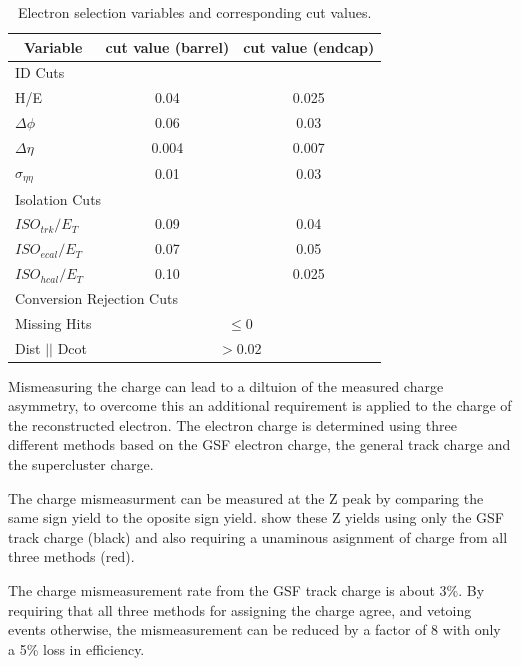 \begin{table}[htbp]
  \begin{center}
    \leavevmode
    \begin{tabular}{lcc} 
      \multicolumn{1}{c}{Variable} & \multicolumn{1}{c}{cut value (barrel)}& \multicolumn{1}{c}{cut value (endcap)}\\
      \hline
      \multicolumn{3}{l}{ID Cuts}\\ 
        H/E & 0.04 & 0.025 \\
        $\Delta\phi$ & 0.06 & 0.03 \\
        $\Delta\eta$ & 0.004 & 0.007  \\
        $\sigma_{\eta\eta}$ & 0.01 & 0.03 \\ \hline
      \multicolumn{3}{l}{Isolation Cuts}\\
        $ISO_{trk} / E_T $  & 0.09 & 0.04 \\
        $ISO_{ecal}/ E_T$  & 0.07 & 0.05 \\
        $ISO_{hcal}/ E_T$  & 0.10 & 0.025 \\ \hline
       \multicolumn{3}{l}{Conversion Rejection Cuts}\\ 
        Missing Hits  & \multicolumn{2}{c|}{$\leq 0$}\\
        Dist $||$ Dcot   & \multicolumn{2}{c|}{$>0.02$}\\
    \end{tabular}
    \caption{\label{tab:elecuts} Electron selection variables and corresponding cut values.}
  \end{center}
\end{table}


Mismeasuring the charge can lead to a diltuion of the measured charge asymmetry,
to overcome this an additional requirement is applied to the charge of the
reconstructed electron. 
The electron charge is determined using three different methods based on the GSF
electron charge, the general track charge and the supercluster charge.

The charge mismeasurment can be measured at the Z peak by comparing the same
sign \HepProcess{\PZ\to\epm\epm} yield to the oposite sign
\HepProcess{\PZ\to\epm\emp} yield.  show these Z yields
using only the \ac{GSF} track charge (black) and also requiring a unaminous
asignment of charge from all three methods (red). 


The charge mismeasurement rate from the GSF track charge is about \unit{3}{\%}.
By requiring that all three methods for assigning the charge agree, and vetoing
events otherwise, the mismeasurement can be reduced by a factor of 8 with only a
\unit{5}{\%} loss in efficiency.

